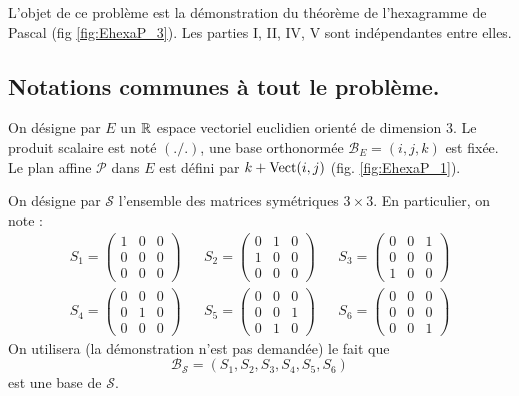 L'objet de ce problème est la démonstration du théorème de l'hexagramme de Pascal (fig \ref{fig:EhexaP_3}). Les parties I, II, IV, V sont indépendantes entre elles.
\subsection*{Notations communes à tout le problème.}
On désigne par $E$ un $\mathbb{R}$ espace vectoriel euclidien orienté de dimension $3$. Le produit scalaire est noté $(./.)$, une base orthonormée $\mathcal B_E = (i,j,k)$ est fixée.\newline
Le plan affine $\mathcal P$ dans $E$ est défini par $k+\operatorname{Vect}(i,j)$ (fig. \ref{fig:EhexaP_1}).

On désigne par $\mathcal S$ l'ensemble des matrices symétriques $3\times 3$. En particulier, on note :
\begin{align*}
 S_1 = 
\begin{pmatrix}
1 & 0 & 0 \\ 0 & 0 & 0 \\ 0 & 0 & 0 
\end{pmatrix}
& &
 S_2 = 
\begin{pmatrix}
0 & 1 & 0 \\ 1 & 0 & 0 \\ 0 & 0 & 0 
\end{pmatrix}
& &
 S_3 = 
\begin{pmatrix}
0 & 0 & 1 \\ 0 & 0 & 0 \\ 1 & 0 & 0 
\end{pmatrix}
\\
 S_4 = 
\begin{pmatrix}
0 & 0 & 0 \\ 0 & 1 & 0 \\ 0 & 0 & 0 
\end{pmatrix}
& &
 S_5 = 
\begin{pmatrix}
0 & 0 & 0 \\ 0 & 0 & 1 \\ 0 & 1 & 0 
\end{pmatrix}
& &
 S_6 = 
\begin{pmatrix}
0 & 0 & 0 \\ 0 & 0 & 0 \\ 0 & 0 & 1 
\end{pmatrix}
\end{align*}
On utilisera (la démonstration n'est pas demandée) le fait que 
\begin{displaymath}
 \mathcal B_{\mathcal S}= (S_1,S_2,S_3,S_4,S_5,S_6)
\end{displaymath}
est une base de $\mathcal S$.

